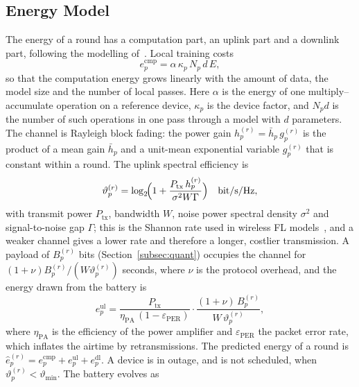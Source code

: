 \subsection{Energy Model}
\label{subsec:energy}
The energy of a round has a computation part, an uplink part and a downlink part, following the modelling of~\cite{tran2019federated,yang2021energy}. Local training costs
\begin{equation}
	e_p^{\mathrm{cmp}}=\alpha\,\kappa_p\,N_p\,d\,E ,
	\label{eq:ecmp}
\end{equation}
so that the computation energy grows linearly with the amount of data, the model size and the number of local passes. Here $\alpha$ is the energy of one multiply--accumulate operation on a reference device, $\kappa_p$ is the device factor, and $N_p d$ is the number of such operations in one pass through a model with $d$ parameters. The channel is Rayleigh block fading: the power gain $h_p^{(r)}=\bar h_p\,g_p^{(r)}$ is the product of a mean gain $\bar h_p$ and a unit-mean exponential variable $g_p^{(r)}$ that is constant within a round. The uplink spectral efficiency is
\begin{equation}
	\vartheta_p^{(r)}=\log_2\!\Bigl(1+\frac{P_{\mathrm{tx}}\,h_p^{(r)}}{\sigma^2W\Gamma}\Bigr)\quad\text{bit/s/Hz},
	\label{eq:rate}
\end{equation}
with transmit power $P_{\mathrm{tx}}$, bandwidth $W$, noise power spectral density $\sigma^2$ and signal-to-noise gap $\Gamma$; this is the Shannon rate used in wireless FL models~\cite{yang2021energy}, and a weaker channel gives a lower rate and therefore a longer, costlier transmission. A payload of $B_p^{(r)}$ bits (Section~\ref{subsec:quant}) occupies the channel for $(1+\nu)B_p^{(r)}/(W\vartheta_p^{(r)})$ seconds, where $\nu$ is the protocol overhead, and the energy drawn from the battery is~\cite{yang2021energy}
\begin{equation}
	e_p^{\mathrm{ul}}=\frac{P_{\mathrm{tx}}}{\eta_{\mathrm{PA}}\,(1-\varepsilon_{\mathrm{PER}})}\cdot\frac{(1+\nu)\,B_p^{(r)}}{W\,\vartheta_p^{(r)}},
	\label{eq:eul}
\end{equation}
where $\eta_{\mathrm{PA}}$ is the efficiency of the power amplifier and $\varepsilon_{\mathrm{PER}}$ the packet error rate, which inflates the airtime by retransmissions.  The predicted energy of a round is $\hat e_p^{(r)}=e_p^{\mathrm{cmp}}+e_p^{\mathrm{ul}}+e_p^{\mathrm{dl}}$. A device is in outage, and is not scheduled, when $\vartheta_p^{(r)}<\vartheta_{\min}$. The battery evolves as
